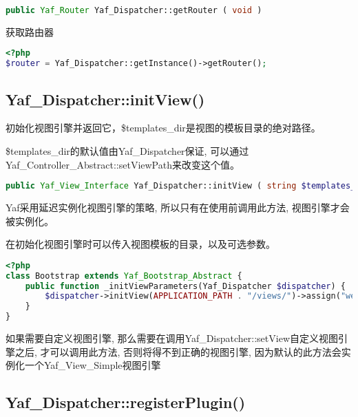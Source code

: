 \begin{lstlisting}[language=PHP]
public Yaf_Router Yaf_Dispatcher::getRouter ( void )
\end{lstlisting}

获取路由器


\begin{lstlisting}[language=PHP]
<?php
$router = Yaf_Dispatcher::getInstance()->getRouter();
\end{lstlisting}





\subsection{Yaf\_Dispatcher::initView()}

初始化视图引擎并返回它，\$templates\_dir是视图的模板目录的绝对路径。

\$templates\_dir的默认值由Yaf\_Dispatcher保证, 可以通过Yaf\_Controller\_Abstract::setViewPath来改变这个值。




\begin{lstlisting}[language=PHP]
public Yaf_View_Interface Yaf_Dispatcher::initView ( string $templates_dir [, array $options ] )
\end{lstlisting}

Yaf采用延迟实例化视图引擎的策略, 所以只有在使用前调用此方法, 视图引擎才会被实例化。

在初始化视图引擎时可以传入视图模板的目录，以及可选参数。




\begin{lstlisting}[language=PHP]
<?php
class Bootstrap extends Yaf_Bootstrap_Abstract {
    public function _initViewParameters(Yaf_Dispatcher $dispatcher) {
        $dispatcher->initView(APPLICATION_PATH . "/views/")->assign("webroot", WEBROOT);
    }
}
\end{lstlisting}









如果需要自定义视图引擎, 那么需要在调用Yaf\_Dispatcher::setView自定义视图引擎之后, 才可以调用此方法, 否则将得不到正确的视图引擎, 因为默认的此方法会实例化一个Yaf\_View\_Simple视图引擎


\subsection{Yaf\_Dispatcher::registerPlugin()}

